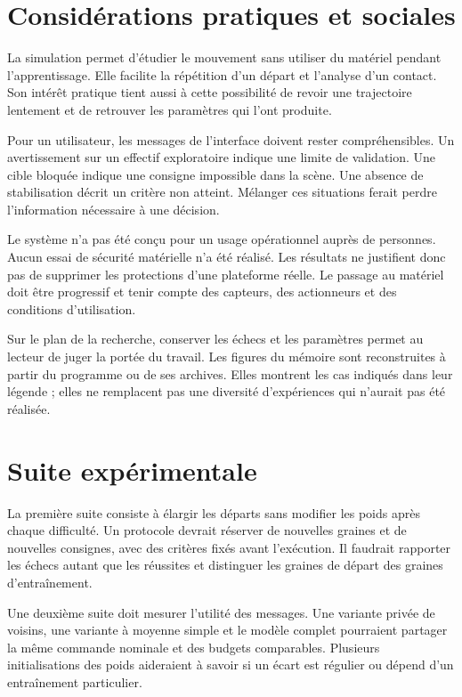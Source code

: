 \section*{Considérations pratiques et sociales}
{}
La simulation permet d'étudier le mouvement sans utiliser du matériel pendant l'apprentissage. Elle facilite la répétition d'un départ et l'analyse d'un contact. Son intérêt pratique tient aussi à cette possibilité de revoir une trajectoire lentement et de retrouver les paramètres qui l'ont produite.

Pour un utilisateur, les messages de l'interface doivent rester compréhensibles. Un avertissement sur un effectif exploratoire indique une limite de validation. Une cible bloquée indique une consigne impossible dans la scène. Une absence de stabilisation décrit un critère non atteint. Mélanger ces situations ferait perdre l'information nécessaire à une décision.

Le système n'a pas été conçu pour un usage opérationnel auprès de personnes. Aucun essai de sécurité matérielle n'a été réalisé. Les résultats ne justifient donc pas de supprimer les protections d'une plateforme réelle. Le passage au matériel doit être progressif et tenir compte des capteurs, des actionneurs et des conditions d'utilisation.

Sur le plan de la recherche, conserver les échecs et les paramètres permet au lecteur de juger la portée du travail. Les figures du mémoire sont reconstruites à partir du programme ou de ses archives. Elles montrent les cas indiqués dans leur légende ; elles ne remplacent pas une diversité d'expériences qui n'aurait pas été réalisée.

\section*{Suite expérimentale}
{}
La première suite consiste à élargir les départs sans modifier les poids après chaque difficulté. Un protocole devrait réserver de nouvelles graines et de nouvelles consignes, avec des critères fixés avant l'exécution. Il faudrait rapporter les échecs autant que les réussites et distinguer les graines de départ des graines d'entraînement.

Une deuxième suite doit mesurer l'utilité des messages. Une variante privée de voisins, une variante à moyenne simple et le modèle complet pourraient partager la même commande nominale et des budgets comparables. Plusieurs initialisations des poids aideraient à savoir si un écart est régulier ou dépend d'un entraînement particulier.

